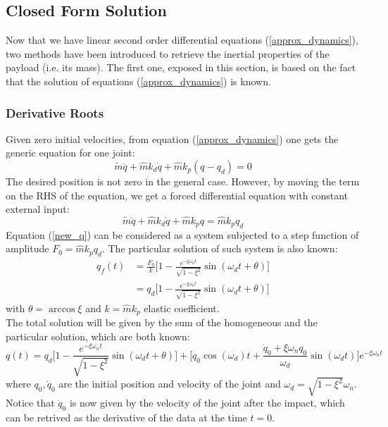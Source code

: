 \documentclass[a4paper,12pt,oneside]{report}
\begin{document}
\subsection{Closed Form Solution}
Now that we have linear second order differential equations (\ref{approx_dynamics}), two methods have been introduced to retrieve the inertial properties of the payload (i.e. its mass). The first one, exposed in this section, is based on the fact that the solution of equations (\ref{approx_dynamics}) is known.
\subsubsection{Derivative Roots}
Given zero initial velocities, from equation (\ref{approx_dynamics}) one gets the generic equation for one joint:
\begin{equation}
  \tilde{m}\ddot{q}+\hat{m}k_d\dot{q}+\hat{m}k_p (q-q_d)=0
\end{equation}
The desired position is not zero in the general case. However, by moving the term on the RHS of the equation, we get a forced differential equation with constant external input:
\begin{equation}
  \tilde{m}\ddot{q}+\hat{m}k_d\dot{q}+\hat{m}k_p q=\hat{m}k_pq_d
  \label{new_q}
\end{equation}
Equation (\ref{new_q}) can be considered as a system subjected to a step function of amplitude $F_0=\hat{m}k_pq_d$. The particular solution of such system is also known:
\begin{equation}
  \begin{split}
  q_f(t)&=\frac{F_0}{k}\Big[1-\frac{e^{-\xi\omega_nt}}{\sqrt{1-\xi^2}}\sin{(\omega_dt+\theta)}\Big]\\
  &=q_d\Big[1-\frac{e^{-\xi\omega_nt}}{\sqrt{1-\xi^2}}\sin{(\omega_dt+\theta)}\Big]
\end{split}
\end{equation}
with $\theta=\arccos{\xi}$ and $k=\hat{m}k_p$ elastic coefficient.\\
The total solution will be given by the sum of the homogeneous and the particular solution, which are both known:
\begin{equation}
  q(t)=q_d\Big[1-\frac{e^{-\xi\omega_nt}}{\sqrt{1-\xi^2}}\sin{(\omega_dt+\theta)}\Big]+\Big[q_0\cos{(\omega_d)t}+\frac{\dot{q}_0+\xi\omega_n q_0}{\omega_d}\sin{(\omega_dt)}\Big]e^{-\xi \omega_n t}
  \label{closed_form}
\end{equation}
where $q_0,\dot{q}_0$ are the initial position and velocity of the joint and $\omega_d=\sqrt{1-\xi^2}\omega_n$. Notice that $\dot{q}_0$ is now given by the velocity of the joint after the impact, which can be retrived as the derivative of the data at the time $t=0$.\\
\end{document}
